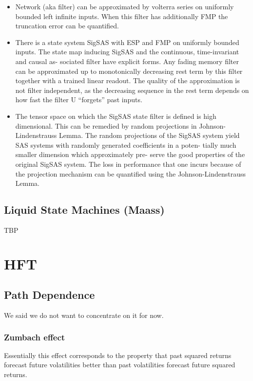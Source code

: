 \documentclass{article}
\begin{document}
\begin{itemize}
    \item Network (aka filter) can be approximated by volterra series on uniformly bounded left infinite inputs. When this filter has additionally FMP the truncation error can be quantified.
    
    \item There is a state system SigSAS with ESP and FMP on uniformly bounded inputs. The state map inducing SigSAS and the continuous, time-invariant and causal as- sociated filter have explicit forms. Any fading memory filter can be approximated up to monotonically decreasing rest term by this filter together with a trained linear readout. The quality of the approximation is not filter independent, as the decreasing sequence in the rest term depends on how fast the filter U “forgets” past inputs.
    
    \item The tensor space on which the SigSAS state filter is defined is high dimensional. This can be remedied by random projections in Johnson-Lindenstrauss Lemma. The random projections of the SigSAS system yield SAS systems with randomly generated coefficients in a poten- tially much smaller dimension which approximately pre- serve the good properties of the original SigSAS system. The loss in performance that one incurs because of the projection mechanism can be quantified using the Johnson-Lindenstrauss Lemma.
    
    
\end{itemize}

\subsection{Liquid State Machines (Maass) \cite{maass}}
TBP

\section{HFT}

\subsection{Path Dependence \cite{pathdep} }
We said we do not want to concentrate on it for now.

\subsubsection{Zumbach effect \cite{zumbach}}
Essentially this effect corresponds to the property that past squared returns forecast future volatilities better than past volatilities forecast future squared returns.
\end{document}
